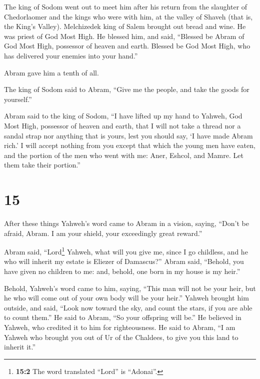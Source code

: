  The king of Sodom went out to meet him after his return
from the slaughter of Chedorlaomer and the kings who were with him, at
the valley of Shaveh (that is, the King's Valley). 
Melchizedek king of Salem brought out bread and wine. He was priest of
God Most High.  He blessed him, and said, ``Blessed be
Abram of God Most High, possessor of heaven and earth. 
Blessed be God Most High, who has delivered your enemies into your
hand.''

Abram gave him a tenth of all.

 The king of Sodom said to Abram, ``Give me the people,
and take the goods for yourself.''

 Abram said to the king of Sodom, ``I have lifted up my
hand to Yahweh, God Most High, possessor of heaven and earth,
 that I will not take a thread nor a sandal strap nor
anything that is yours, lest you should say, `I have made Abram rich.'
 I will accept nothing from you except that which the
young men have eaten, and the portion of the men who went with me: Aner,
Eshcol, and Mamre. Let them take their portion.''

\hypertarget{section-14}{%
\section{15}\label{section-14}}

 After these things Yahweh's word came to Abram in a
vision, saying, ``Don't be afraid, Abram. I am your shield, your
exceedingly great reward.''

 Abram said, ``Lord\footnote{\textbf{15:2} The word
  translated ``Lord'' is ``Adonai''.} Yahweh, what will you give me,
since I go childless, and he who will inherit my estate is Eliezer of
Damascus?''  Abram said, ``Behold, you have given no
children to me: and, behold, one born in my house is my heir.''

 Behold, Yahweh's word came to him, saying, ``This man
will not be your heir, but he who will come out of your own body will be
your heir.''  Yahweh brought him outside, and said, ``Look
now toward the sky, and count the stars, if you are able to count
them.'' He said to Abram, ``So your offspring will be.'' 
He believed in Yahweh, who credited it to him for righteousness.
 He said to Abram, ``I am Yahweh who brought you out of Ur
of the Chaldees, to give you this land to inherit it.''

